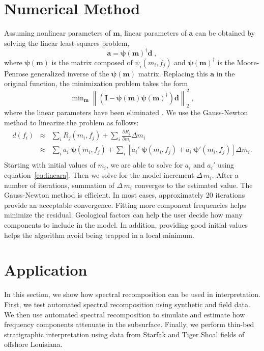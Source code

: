 \section{Numerical Method}
Assuming nonlinear parameters of $\mathbf{m}$, linear parameters of $\mathbf{a}$ can be obtained by solving the linear least-squares problem,
\begin{equation}
\label{eq:lineara}
\mathbf{a}=\pmb{\psi}(\mathbf{m})^\dagger\mathbf{d}\;,
\end{equation}
where $\pmb{\psi}(\mathbf{m})$ is the matrix composed of $\psi_i(m_i,f_j)$ and $\pmb{\psi}(\mathbf{m})^\dagger$ is the Moore-Penrose generalized inverse of the $\pmb{\psi}(\mathbf{m})$ matrix. Replacing this $\mathbf{a}$ in the original function, the minimization problem takes the form
\begin{equation}
\label{eq:nonlinear}
\mathop{\mbox{min}}_{\mathbf{m}}\left\|(\pmb{I}-\pmb{\psi}(\mathbf{m})\pmb{\psi}(\mathbf{m})^\dagger)\mathbf{d}\right\|_2^2\;,
\end{equation}
where the linear parameters have been eliminated  \cite[]{Golub}. We use the Gauss-Newton method \cite[]{Ake} to linearize the problem as follows:
\begin{eqnarray}
\label{eqn:gauss}
d(f_i) & \approx & \sum_i{R_j(m_i,f_j)}+\sum_i\frac{\partial R_j}{\partial m_i}\Delta{m_i} \nonumber \\
       & \approx & \sum_i{a_i\;\pmb{\psi}(m_i,f_j)}+\sum_i[a_i'\;\pmb{\psi}(m_i,f_j)+a_i\;\pmb{\psi}'(m_i,f_j)]\Delta{m_i}. \nonumber \\
\end{eqnarray}
Starting with initial values of ${m_i}$, we are able to solve for ${a_i}$ and ${a_i'}$ using equation~\ref{eq:lineara}. Then we solve for the model increment $\Delta{\,{m_i}}$. After a number of iterations, summation of $\Delta\,{{m_i}}$ converges to the estimated value. The Gauss-Newton method is efficient. In most cases, approximately 20 iterations provide an acceptable convergence. Fitting more component frequencies helps minimize the residual. Geological factors can help the user decide how many components to include in the model. In addition, providing good initial values helps the algorithm avoid being trapped in a local minimum.
 
\section{Application}
In this section, we show how spectral recomposition can be used in interpretation. First, we test automated spectral recomposition using synthetic and field data. We then use automated spectral recomposition to simulate and estimate how frequency components attenuate in the subsurface. Finally, we perform thin-bed stratigraphic interpretation using data from Starfak and Tiger Shoal fields of offshore Louisiana.

